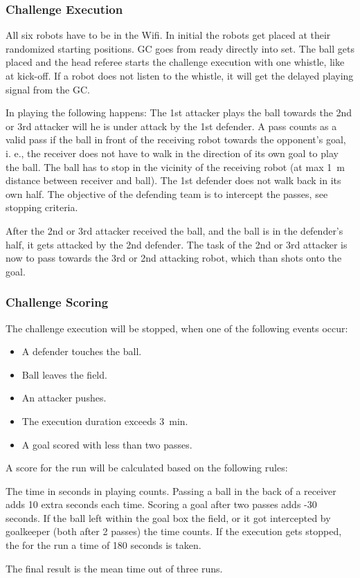 \subsubsection{Challenge Execution}

All six robots have to be in the Wifi. In initial the robots get placed at their randomized starting positions. GC goes from ready directly into set. The ball gets placed and the head referee starts the challenge execution with one whistle, like at kick-off. If a robot does not listen to the whistle, it will get the delayed playing signal from the GC.

In playing the following happens: The 1st attacker plays the ball towards the 2nd or 3rd attacker will he is under attack by the 1st defender. A pass counts as a valid pass if the ball in front of the receiving robot towards the opponent's goal, i. e., the receiver does not have to walk in the direction of its own goal to play the ball. The ball has to stop in the vicinity of the receiving robot (at max \qty{1}{\metre} distance between receiver and ball).
The 1st defender does not walk back in its own half. The objective of the defending team is to intercept the passes, see stopping criteria.

After the 2nd or 3rd attacker received the ball, and the ball is in the defender's half, it gets attacked by the 2nd defender. The task of the 2nd or 3rd attacker is now to pass towards the 3rd or 2nd attacking robot, which than shots onto the goal.

\subsubsection{Challenge Scoring}

The challenge execution will be stopped, when one of the following events occur:

\begin{itemize}
    \item A defender touches the ball.
    \item Ball leaves the field.
    \item An attacker pushes.
    \item The execution duration exceeds \qty{3}{\minute}.
    \item A goal scored with less than two passes.
\end{itemize}

A score for the run will be calculated based on the following rules:

The time in seconds in playing counts. Passing a ball in the back of a receiver adds 10 extra seconds each time. Scoring a goal after two passes adds -30 seconds.
If the ball left within the goal box the field, or it got intercepted by goalkeeper (both after 2 passes) the time counts.
If the execution gets stopped, the for the run a time of 180 seconds is taken.

The final result is the mean time out of three runs.